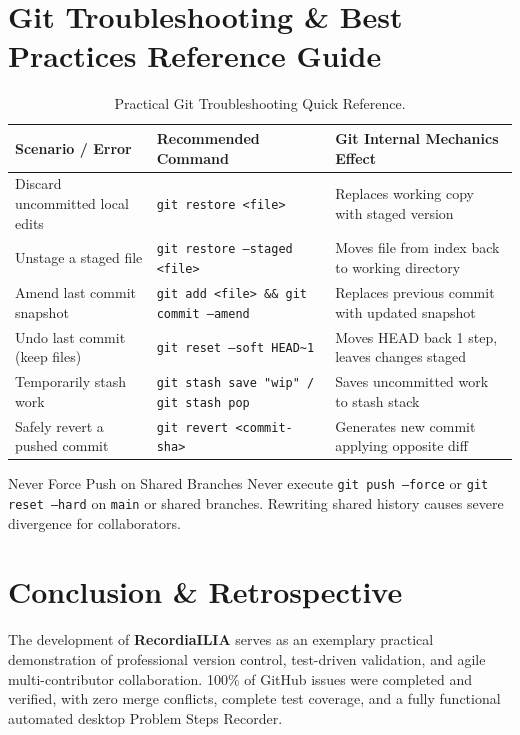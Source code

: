\documentclass[10pt,a4paper]{article}
\begin{document}
\section{Git Troubleshooting \& Best Practices Reference Guide}
\begin{table}[h!]
\centering
\small
\begin{tabularx}{\textwidth}{l X l}
\toprule
\textbf{Scenario / Error} & \textbf{Recommended Command} & \textbf{Git Internal Mechanics Effect} \\
\midrule
Discard uncommitted local edits & \texttt{git restore <file>} & Replaces working copy with staged version \\
Unstage a staged file & \texttt{git restore --staged <file>} & Moves file from index back to working directory \\
Amend last commit snapshot & \texttt{git add <file> \&\& git commit --amend} & Replaces previous commit with updated snapshot \\
Undo last commit (keep files) & \texttt{git reset --soft HEAD\textasciitilde 1} & Moves HEAD back 1 step, leaves changes staged \\
Temporarily stash work & \texttt{git stash save "wip" / git stash pop} & Saves uncommitted work to stash stack \\
Safely revert a pushed commit & \texttt{git revert <commit-sha>} & Generates new commit applying opposite diff \\
\bottomrule
\end{tabularx}
\caption{Practical Git Troubleshooting Quick Reference.}
\end{table}

\begin{warningbox}{Never Force Push on Shared Branches}
Never execute \texttt{git push --force} or \texttt{git reset --hard} on \texttt{main} or shared branches. Rewriting shared history causes severe divergence for collaborators.
\end{warningbox}

\section{Conclusion \& Retrospective}
The development of \textbf{RecordiaILIA} serves as an exemplary practical demonstration of professional version control, test-driven validation, and agile multi-contributor collaboration. 100\% of GitHub issues were completed and verified, with zero merge conflicts, complete test coverage, and a fully functional automated desktop Problem Steps Recorder.
\end{document}
